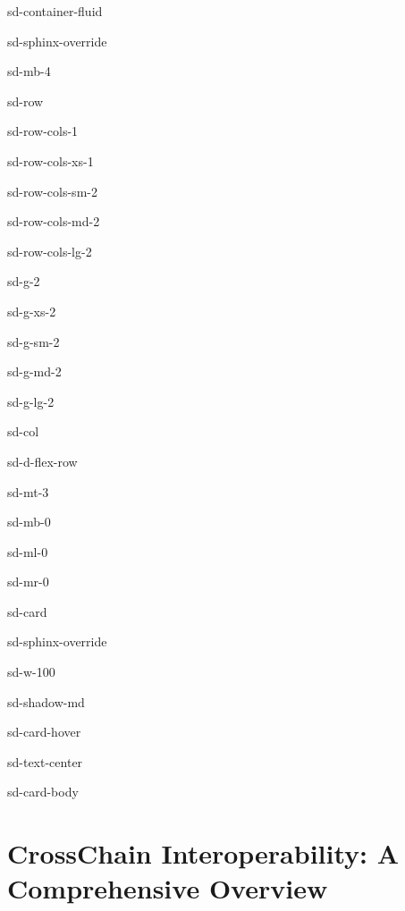 \documentclass[letterpaper,10pt,english]{jupyterBook}
\begin{document}
\begin{sphinxuseclass}{sd-container-fluid}
\begin{sphinxuseclass}{sd-sphinx-override}
\begin{sphinxuseclass}{sd-mb-4}
\begin{sphinxuseclass}{sd-row}
\begin{sphinxuseclass}{sd-row-cols-1}
\begin{sphinxuseclass}{sd-row-cols-xs-1}
\begin{sphinxuseclass}{sd-row-cols-sm-2}
\begin{sphinxuseclass}{sd-row-cols-md-2}
\begin{sphinxuseclass}{sd-row-cols-lg-2}
\begin{sphinxuseclass}{sd-g-2}
\begin{sphinxuseclass}{sd-g-xs-2}
\begin{sphinxuseclass}{sd-g-sm-2}
\begin{sphinxuseclass}{sd-g-md-2}
\begin{sphinxuseclass}{sd-g-lg-2}
\begin{sphinxuseclass}{sd-col}
\begin{sphinxuseclass}{sd-d-flex-row}
\begin{sphinxuseclass}{sd-mt-3}
\begin{sphinxuseclass}{sd-mb-0}
\begin{sphinxuseclass}{sd-ml-0}
\begin{sphinxuseclass}{sd-mr-0}
\begin{sphinxuseclass}{sd-card}
\begin{sphinxuseclass}{sd-sphinx-override}
\begin{sphinxuseclass}{sd-w-100}
\begin{sphinxuseclass}{sd-shadow-md}
\begin{sphinxuseclass}{sd-card-hover}
\begin{sphinxuseclass}{sd-text-center}
\begin{sphinxuseclass}{sd-card-body}
\end{sphinxuseclass}
\end{sphinxuseclass}
\end{sphinxuseclass}
\end{sphinxuseclass}
\end{sphinxuseclass}
\end{sphinxuseclass}
\end{sphinxuseclass}
\end{sphinxuseclass}
\end{sphinxuseclass}
\end{sphinxuseclass}
\end{sphinxuseclass}
\end{sphinxuseclass}
\end{sphinxuseclass}
\end{sphinxuseclass}
\end{sphinxuseclass}
\end{sphinxuseclass}
\end{sphinxuseclass}
\end{sphinxuseclass}
\end{sphinxuseclass}
\end{sphinxuseclass}
\end{sphinxuseclass}
\end{sphinxuseclass}
\end{sphinxuseclass}
\end{sphinxuseclass}
\end{sphinxuseclass}
\end{sphinxuseclass}
\end{sphinxuseclass}
\sphinxstepscope


\section{Cross\sphinxhyphen{}Chain Interoperability: A Comprehensive Overview}
\label{\detokenize{Interoperability/Cross-Chain Interoperability:cross-chain-interoperability-a-comprehensive-overview}}\label{\detokenize{Interoperability/Cross-Chain Interoperability::doc}}
\sphinxAtStartPar
{}
\end{document}
